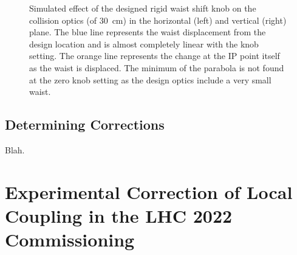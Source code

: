\begin{figure}[htp]
    \centering
    \hspace{0.3cm}
    \caption{Simulated effect of the designed rigid waist shift knob on the collision optics (\betastar of \qty{30}{\centi\metre}) in the horizontal (left) and vertical (right) plane. The blue line represents the waist displacement from the design location and is almost completely linear with the knob setting. The orange line represents the \betafunction change at the IP point itself as the waist is displaced. The minimum of the parabola is not found at the zero knob setting as the design optics include a very small waist.}
    \label{figure:rigid_waist_shift_knob_effect2}
\end{figure}

\subsection{Determining Corrections}

Blah.


\section{Experimental Correction of Local Coupling in the LHC \num{2022} Commissioning}

